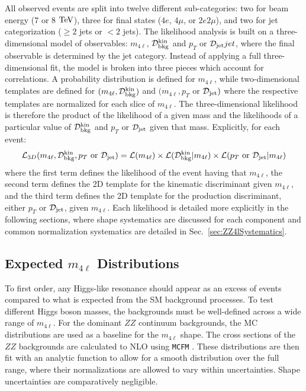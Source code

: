 All observed events are split into twelve different sub-categories: two for beam energy ($7$ or $8$ $\rm{TeV}$), three for final states ($4e$, $4\mu$, or $2e2\mu$), and two for jet categorization ($\geq2$ jets or $<2$ jets). The likelihood analysis is built on a three-dimensional model of observables: $m_{4\ell}$, $\mathcal{D}_{\rm{bkg}}^{\rm{kin}}$ and $p_T$ or $\mathcal{D}_{\rm jet}{jet}$, where the final observable is determined by the jet category. Instead of applying a full three-dimensional fit, the model is broken into three pieces which account for correlations. A probability distribution is defined for $m_{4\ell}$, while two-dimensional templates are defined for $(m_{4\ell},\mathcal{D}_{\rm{bkg}}^{\rm{kin}})$ and $(m_{4\ell},p_T$ or $\mathcal{D}_{\rm jet})$ where the respective templates are normalized for each slice of $m_{4\ell}$. The three-dimensional likelihood is therefore the product of the likelihood of a given mass and the likelihoods of a particular value of $\mathcal{D}_{\rm{bkg}}^{\rm{kin}}$ and $p_T$ or $\mathcal{D}_{\rm jet}$ given that mass. Explicitly, for each event:
\begin{equation}
\label{eqn:likelihoodXS}
\mathcal{L}_{3D}(m_{4\ell},\mathcal{D}_{\rm{bkg}}^{\rm{kin}},p_T \mathrm{~or~} \mathcal{D}_{\rm jet})=\mathcal{L}(m_{4\ell}) \times \mathcal{L}(\mathcal{D}_{\rm{bkg}}^{\rm{kin}}|m_{4\ell}) \times \mathcal{L}(p_T \mathrm{~or~}  \mathcal{D}_{\rm jet}|m_{4\ell})
\end{equation}
where the first term defines the likelihood of the event having that $m_{4\ell}$, the second term defines the 2D template for the kinematic discriminant given $m_{4\ell}$, and the third term defines the 2D template for the production discriminant, either $p_T$ or $\mathcal{D}_{\rm jet}$, given $m_{4\ell}$. Each likelihood is detailed more explicitly in the following sections, where shape systematics are discussed for each component and common normalization systematics are detailed in Sec.~\ref{sec:ZZ4lSystematics}.

\subsection{Expected $m_{4\ell}$ Distributions}
\label{sec:ZZ4lMassShape}

To first order, any Higgs-like resonance should appear as an excess of events compared to what is expected from the SM background processes. To test different Higgs boson masses, the backgrounds must be well-defined across a wide range of $m_{4\ell}$. For the dominant $ZZ$ continuum backgrounds, the MC distributions are used as a baseline for the $m_{4\ell}$ shape. The cross sections of the $ZZ$ backgrounds are calculated to NLO using {\tt MCFM} \cite{MCFM,Campbell:1999ah,Campbell:2011bn}. These distributions are then fit with an analytic function to allow for a smooth distribution over the full range, where their normalizations are allowed to vary within uncertainties. Shape uncertainties are comparatively negligible.

